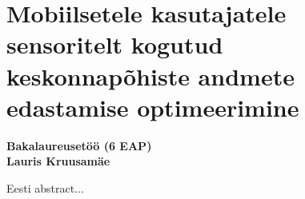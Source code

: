 \chapter[Resümee]{Mobiilsetele kasutajatele sensoritelt kogutud keskonnapõhiste andmete edastamise optimeerimine} %
\textbf{Bakalaureusetöö (6 EAP)}\\
\textbf{Lauris Kruusamäe}

Eesti abstract...





\ifpdf
    \graphicspath{{7/figures/PNG/}{7/figures/PDF/}{7/figures/}}
\else
    \graphicspath{{7/figures/EPS/}{7/figures/}}
\fi








